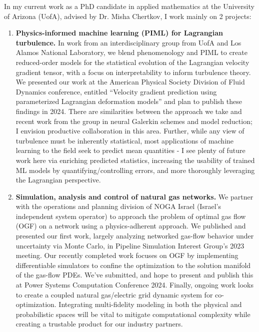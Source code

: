 \documentclass[11pt,a4paper,sans]{moderncv}        %
\begin{document}
In my current work as a PhD candidate in applied mathematics at the University of Arizona (UofA), advised by Dr. Misha Chertkov, I work mainly on 2 projects:
\begin{enumerate}
\item \textbf{Physics-informed machine learning (PIML) for Lagrangian turbulence.} In work from an interdisciplinary group from UofA and Los Alamos National Laboratory, we blend phenomenology and PIML to create reduced-order models for the statistical evolution of the Lagrangian velocity gradient tensor, with a focus on interpretability to inform turbulence theory.
  We presented our work at the American Physical Society Division of Fluid Dynamics conference, entitled ``Velocity gradient prediction using parameterized Lagrangian deformation models'' and plan to publish these findings in 2024.
  There are similarities between the approach we take and recent work from the group in neural Galerkin schemes and model reduction; I envision productive collaboration in this area.
Further, while any view of turbulence must be inherently statistical, most applications of machine learning to the field seek to predict mean quantities - I see plenty of future work here via enriching predicted statistics, increasing the usability of trained ML models by quantifying/controlling errors, and more thoroughly leveraging the Lagrangian perspective.

\item \textbf{Simulation, analysis and control of natural gas networks.} We partner with the operations and planning division of NOGA Israel (Israel's independent system operator) to approach the problem of optimal gas flow (OGF) on a network using a physics-adherent approach. We published and presented our first work, largely analyzing networked gas-flow behavior under uncertainty via Monte Carlo, in Pipeline Simulation Interest Group's 2023 meeting. Our recently completed work focuses on OGF by implementing differentiable simulators to confine the optimization to the solution manifold of the gas-flow PDEs. We've submitted, and hope to present and publish this at Power Systems Computation Conference 2024. Finally, ongoing work looks to create a coupled natural gas/electric grid dynamic system for co-optimization. Integrating multi-fidelity modeling in both the physical and probabilistic spaces will be vital to mitigate computational complexity while creating a trustable product for our industry partners.
\end{enumerate}
\end{document}
